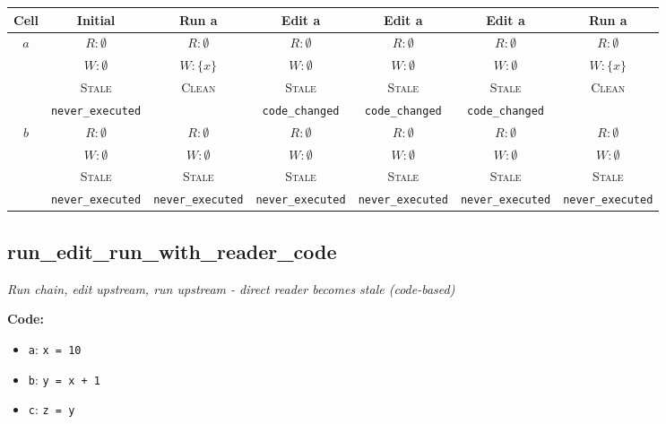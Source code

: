 \documentclass{article}
\begin{document}
\begin{center}
\small
\begin{tabular}{|c|c|c|c|c|c|c|}
\hline
\textbf{Cell} & \textbf{Initial} & \textbf{Run a} & \textbf{Edit a} & \textbf{Edit a} & \textbf{Edit a} & \textbf{Run a} \\
\hline
\multirow{4}{*}{$a$}
  & $R: \emptyset$ & $R: \emptyset$ & $R: \emptyset$ & $R: \emptyset$ & $R: \emptyset$ & $R: \emptyset$ \\
  & $W: \emptyset$ & $W: \{x\}$ & $W: \emptyset$ & $W: \emptyset$ & $W: \emptyset$ & $W: \{x\}$ \\
  & \textsc{Stale} & \textsc{Clean} & \textsc{Stale} & \textsc{Stale} & \textsc{Stale} & \textsc{Clean} \\
  & \footnotesize\texttt{never\_executed} &  & \footnotesize\texttt{code\_changed} & \footnotesize\texttt{code\_changed} & \footnotesize\texttt{code\_changed} &  \\
\hline
\multirow{4}{*}{$b$}
  & $R: \emptyset$ & $R: \emptyset$ & $R: \emptyset$ & $R: \emptyset$ & $R: \emptyset$ & $R: \emptyset$ \\
  & $W: \emptyset$ & $W: \emptyset$ & $W: \emptyset$ & $W: \emptyset$ & $W: \emptyset$ & $W: \emptyset$ \\
  & \textsc{Stale} & \textsc{Stale} & \textsc{Stale} & \textsc{Stale} & \textsc{Stale} & \textsc{Stale} \\
  & \footnotesize\texttt{never\_executed} & \footnotesize\texttt{never\_executed} & \footnotesize\texttt{never\_executed} & \footnotesize\texttt{never\_executed} & \footnotesize\texttt{never\_executed} & \footnotesize\texttt{never\_executed} \\
\hline
\end{tabular}
\end{center}


\subsection{run\_edit\_run\_with\_reader\_code}
\textit{Run chain, edit upstream, run upstream - direct reader becomes stale (code-based)}

\textbf{Code:}
\begin{itemize}
  \item \texttt{a}: \verb|x = 10|
  \item \texttt{b}: \verb|y = x + 1|
  \item \texttt{c}: \verb|z = y|
\end{itemize}
\end{document}
